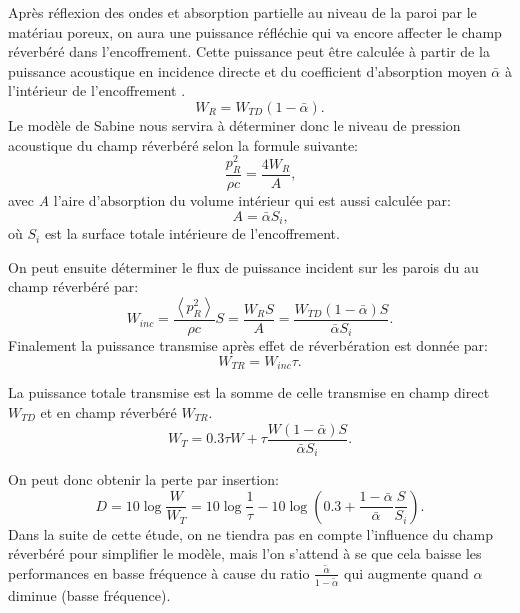 \documentclass[12pt,foolscap]{report}
\begin{document}
	Après réflexion des ondes et absorption partielle au niveau de la paroi par le matériau poreux, on aura une puissance réfléchie qui va encore affecter le champ réverbéré dans l'encoffrement. Cette puissance peut être calculée à partir de la puissance acoustique en incidence directe et du coefficient d'absorption moyen \(\bar \alpha \) à l'intérieur de l'encoffrement  .
	\begin{equation}
	W_R = W_{TD}(1 - \bar \alpha )\text{.}
	\end{equation}
	Le modèle de Sabine nous servira à déterminer donc le niveau de pression acoustique du champ réverbéré selon la formule suivante:
	\begin{equation}
	\frac{{p_R^2}}{{\rho c}} = \frac{{4{W_R}}}{A}\text{,}
	\end{equation}
	avec \textit{A} l'aire d'absorption du volume intérieur qui est aussi calculée par:
	\begin{equation}
	A = \bar \alpha {S_i}\text{,}
	\end{equation}
	où \({S_i}\)  est la surface totale intérieure de l'encoffrement.
	
	On peut ensuite déterminer le flux de puissance incident sur les parois du au champ réverbéré par:
	\begin{equation}
	{W_{inc}} = \frac{{\left\langle {p_R^2} \right\rangle }}{{\rho c}}S = \frac{{{W_R}S}}{A} = \frac{{W_{TD}(1 - \bar \alpha )S}}{{\bar \alpha {S_i}}}\text{.}
	\end{equation}
	Finalement la puissance transmise après effet de réverbération est donnée par:
	\begin{equation}
	{W_{TR}} = {W_{inc}}\tau \text{.}
	\end{equation}
	
	La puissance totale transmise est la somme de celle transmise en champ direct \(W_{TD}\) et en champ réverbéré \(W_{TR}\).
	\begin{equation}
	{W_T} = 0.3\tau W + \tau \frac{{W(1 - \bar \alpha )S}}{{\bar \alpha {S_i}}}\text{.}
	\end{equation}
	
	On peut donc obtenir la perte par insertion:
	\begin{equation}
	D = 10\log \frac{W}{{{W_T}}} = 10\log \frac{1}{\tau } - 10\log (0.3 + \frac{{1 - \bar \alpha }}{{\bar \alpha }}\frac{S}{{{S_i}}})\text{.}
	\end{equation}
	Dans la suite de cette étude, on ne tiendra pas en compte l'influence du champ réverbéré pour simplifier le modèle, mais l'on s'attend à se que cela baisse les performances en basse fréquence à cause du ratio $\frac{\tilde{\alpha}}{1-\tilde{\alpha}}$ qui augmente quand $\alpha$ diminue (basse fréquence).
	
\end{document}
